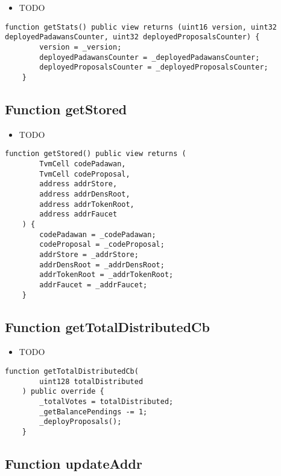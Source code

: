 \begin{itemize}
\item TODO
\end{itemize}

\begin{lstlisting}[firstnumber=214]
    function getStats() public view returns (uint16 version, uint32 deployedPadawansCounter, uint32 deployedProposalsCounter) {
        version = _version;
        deployedPadawansCounter = _deployedPadawansCounter;
        deployedProposalsCounter = _deployedProposalsCounter;
    }
\end{lstlisting}

\subsection{Function getStored}

\begin{itemize}
\item TODO
\end{itemize}

\begin{lstlisting}[firstnumber=198]
    function getStored() public view returns (
        TvmCell codePadawan,
        TvmCell codeProposal,
        address addrStore,
        address addrDensRoot,
        address addrTokenRoot,
        address addrFaucet
    ) {
        codePadawan = _codePadawan;
        codeProposal = _codeProposal;
        addrStore = _addrStore;
        addrDensRoot = _addrDensRoot;
        addrTokenRoot = _addrTokenRoot;
        addrFaucet = _addrFaucet;
    }
\end{lstlisting}

\subsection{Function getTotalDistributedCb}

\begin{itemize}
\item TODO
\end{itemize}

\begin{lstlisting}[firstnumber=148]
    function getTotalDistributedCb(
        uint128 totalDistributed
    ) public override {
        _totalVotes = totalDistributed;
        _getBalancePendings -= 1;
        _deployProposals();
    }
\end{lstlisting}

\subsection{Function updateAddr}

